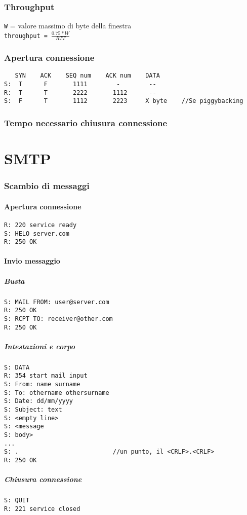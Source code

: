 \documentclass[12pt]{article}
\begin{document}
\subsubsection{Throughput}
\texttt{W} = valore massimo di byte della finestra\\
\texttt{throughput = $\frac{0.75 * W}{RTT}$}
\subsubsection{Apertura connessione}
\begin{verbatim}
   SYN    ACK    SEQ num    ACK num    DATA
S:  T      F       1111        -        --
R:  T      T       2222       1112      --
S:  F      T       1112       2223     X byte    //Se piggybacking
\end{verbatim}
\subsubsection{Tempo necessario chiusura connessione}

\section{SMTP}
\subsubsection{Scambio di messaggi}
\paragraph{Apertura connessione}
\begin{verbatim}
R: 220 service ready
S: HELO server.com
R: 250 OK
\end{verbatim}
\paragraph{Invio messaggio}
\subparagraph{Busta}
\begin{verbatim}
S: MAIL FROM: user@server.com
R: 250 OK
S: RCPT TO: receiver@other.com
R: 250 OK
\end{verbatim}
\subparagraph{Intestazioni e corpo}
\begin{verbatim}
S: DATA
R: 354 start mail input
S: From: name surname
S: To: othername othersurname
S: Date: dd/mm/yyyy
S: Subject: text
S: <empty line>
S: <message
S: body>
...
S: .                          //un punto, il <CRLF>.<CRLF>
R: 250 OK
\end{verbatim}
\subparagraph{Chiusura connessione}
\begin{verbatim}
S: QUIT
R: 221 service closed
\end{verbatim}
\end{document}
